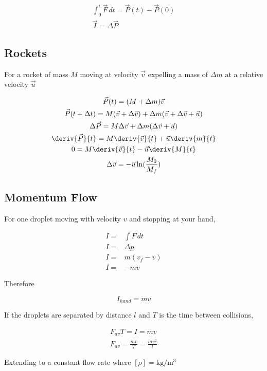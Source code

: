 \documentclass{notes}
\begin{document}
\begin{gather}
    \int_{0}^{t}\vec{F}\, dt = \vec{P}(t) - \vec{P}(0)\\
    \vec{I} = \Delta \vec{P}
\end{gather}

\subsection{Rockets}

For a rocket of mass \(M\) moving at velocity \(\vec{v}\) expelling a mass of \(\Delta m\) at a relative velocity \(\vec{u}\)

\begin{gather}
    \vec{P}(t) = (M+\Delta m)\vec{v}\\
    \vec{P}(t+\Delta t) = M(\vec{v}+\Delta \vec{v}) + \Delta m (\vec{v} + \Delta \vec{v} + \vec{u})\\
    \Delta \vec{P} = M\Delta \vec{v} + \Delta m(\Delta \vec{v} + \vec{u})\\
    \deriv{\vec{P}}{t} = M \deriv{\vec{v}}{t} + \vec{u} \deriv{m}{t}\\
    0 = M \deriv{\vec{v}}{t} - \vec{u} \deriv{M}{t}\\
    \Delta \vec{v} = -\vec{u} \ln(\frac{M_0}{M_f})
\end{gather}

\subsection{Momentum Flow}

For one droplet moving with velocity \(v\) and stopping at your hand,

\begin{align}
    I =& \int F\,dt\\
    I =& \Delta p\\
    I =& m(v_f - v)\\
    I =& -mv
\end{align}

Therefore

\[I_{hand} = mv\]

If the droplets are separated by distance \(l\) and \(T\) is the time between collisions,

\begin{gather}
    F_{av}T = I = mv\\
    F_{av} = \frac{mv}{T} = \frac{mv^2}{l}
\end{gather}

Extending to a constant flow rate where \([\rho] = \unit{\kilogram \per \metre^3}\)
\end{document}
